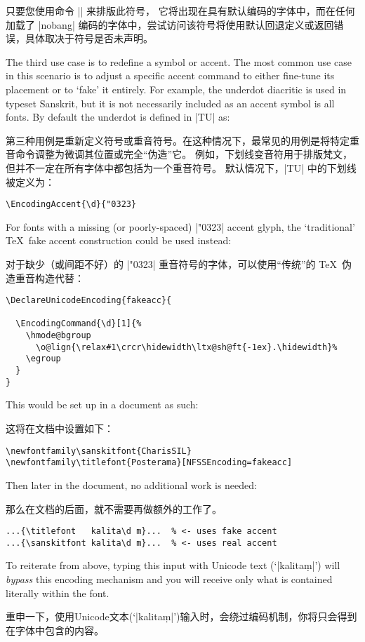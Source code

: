 \documentclass[a4paper]{l3doc}
\begin{document}
只要您使用命令 |\textinterrobang| 来排版此符号，
它将出现在具有默认编码的字体中，而在任何加载了 |nobang| 编码的字体中，尝试访问该符号将使用默认回退定义或返回错误，具体取决于符号是否未声明。

The third use case is to redefine a symbol or accent. The most common use case
in this scenario is to adjust a specific accent command to either fine-tune its placement
or to `fake' it entirely.
For example, the underdot diacritic is used in typeset Sanskrit,
but it is not necessarily included as an accent symbol is all fonts.
By default the underdot is defined in |TU| as:

第三种用例是重新定义符号或重音符号。在这种情况下，最常见的用例是将特定重音命令调整为微调其位置或完全“伪造”它。
例如，下划线变音符用于排版梵文，但并不一定在所有字体中都包括为一个重音符号。
默认情况下，|TU| 中的下划线被定义为：
\begin{Verbatim}
\EncodingAccent{\d}{"0323}
\end{Verbatim}
For fonts with a missing (or poorly-spaced) |"0323| accent glyph, the `traditional' \TeX\ fake accent
construction could be used instead:

对于缺少（或间距不好）的 |"0323| 重音符号的字体，可以使用“传统”的 \TeX\ 伪造重音构造代替：
\begin{Verbatim}
\DeclareUnicodeEncoding{fakeacc}{
  
  \EncodingCommand{\d}[1]{%
    \hmode@bgroup
      \o@lign{\relax#1\crcr\hidewidth\ltx@sh@ft{-1ex}.\hidewidth}%
    \egroup
  }
}
\end{Verbatim}
This would be set up in a document as such:

这将在文档中设置如下：

\begin{Verbatim}
\newfontfamily\sanskitfont{CharisSIL}
\newfontfamily\titlefont{Posterama}[NFSSEncoding=fakeacc]
\end{Verbatim}
Then later in the document, no additional work is needed:

那么在文档的后面，就不需要再做额外的工作了。
\begin{Verbatim}
...{\titlefont   kalita\d m}...  % <- uses fake accent
...{\sanskitfont kalita\d m}...  % <- uses real accent
\end{Verbatim}
To reiterate from above, typing this input with Unicode text (`|kalitaṃ|')
will \emph{bypass} this encoding mechanism and you will receive only what is contained
literally within the font.

重申一下，使用Unicode文本(`|kalitaṃ|')输入时，会绕过编码机制，你将只会得到在字体中包含的内容。
\end{document}

